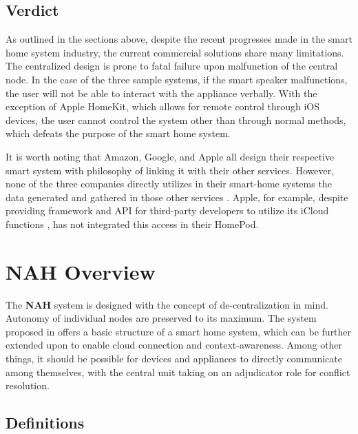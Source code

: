\documentclass[letterpaper, twocolumn, 10pt, conference]{IEEEtran}
\newcommand{\term}[1]{\textbf{#1}}
\begin{document}
\subsection{Verdict} \label{ssec:verdict}

As outlined in the sections above, despite the recent progresses made in the smart home system industry, the current commercial solutions share many limitations. The centralized design is prone to fatal failure upon malfunction of the central node. In the case of the three sample systems, if the smart speaker malfunctions, the user will not be able to interact with the appliance verbally. With the exception of Apple HomeKit, which allows for remote control through iOS devices, the user cannot control the system other than through normal methods, which defeats the purpose of the smart home system.

It is worth noting that Amazon, Google, and Apple all design their respective smart system with philosophy of linking it with their other services. However, none of the three companies directly utilizes in their smart-home systems the data generated and gathered in those other services \cite{barrett2017what, ng2017homepod}. Apple, for example, despite providing framework and API for third-party developers to utilize its iCloud functions \cite{apple2018cloudkit}, has not integrated this access in their HomePod.

\section{NAH Overview} \label{sec:overview}

The \term{NAH} system is designed with the concept of de-centralization in mind. Autonomy of individual nodes are preserved to its maximum. The system proposed in \cite{petrov2018home} offers a basic structure of a smart home system, which can be further extended upon to enable cloud connection and context-awareness. Among other things, it should be possible for devices and appliances to directly communicate among themselves, with the central unit taking on an adjudicator role for conflict resolution.

\subsection*{Definitions} \label{ssec:definitions}
\end{document}
